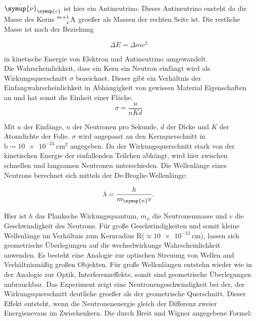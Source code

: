 \noindent $\bar{\symup{\nu}}_{\symup{e}}$ ist hier ein Antineutrino. Dieses Antineutrino ensteht da die Masse des Kerns $\ce{^{m+1}_z \text{A}}$ 
groeßer als Massen der rechten Seite ist. Die restliche Masse ist nach der Beziehung

\begin{equation*}
   \Delta E = \Delta m c^2 \nonumber
\end{equation*}

\noindent in kinetische Energie von Elektron und Antineutrino umgewandelt.\\
Die Wahrscheinlichkeit, dass ein Kern ein Neutron einfängt wird als Wirkungsquerschnitt $\sigma$ bezeichnet. Dieser gibt ein Verhältnis der 
Einfangwahrscheinlichkeit in Abhängigkeit von gewissen Material Eigenschaften an und hat somit die Einheit einer Fläche.
\begin{equation*}
   \sigma = \frac{u}{nKd} \nonumber
\end{equation*}

\noindent Mit $u$ der Einfänge, $n$ der Neutronen pro Sekunde, $d$ der Dicke und $K$ der Atomdichte der Folie. $\sigma$ wird angepasst an den 
Kernquerschnitt in $\si{\barn} \coloneqq \SI{10e-24}{\centi\metre\squared}$  angegeben. Da der Wirkungsquerschnitt stark von der kinetischen Energie 
der einfallenden Teilchen abhängt, wird hier zwischen schnellen und langsamen Neutronen unterschieden. Die Wellenlänge eines Neutrons 
berechnet sich mittels der De-Broglie-Wellenlänge:

\begin{equation*}
   \lambda = \frac{h}{m_{\symup{n}}v}. \nonumber
\end{equation*}

\noindent Hier ist $h$ das Planksche Wirkungsquantum, $m_n$ die Neutronenmasse und $v$ die Geschwindigkeit des Neutrons. Für große Geschwindigkeiten 
und somit kleine Wellenlänge im Verhältnis zum Kernradius R($\approx \SI{10e-12}{\centi\meter}$), lassen sich geometrische Überlegungen auf die 
wechselwirkungs Wahrscheinlichkeit anwenden. Es besteht eine Analogie zur optischen Streuung von Wellen and Verhältnismäßig großen Objekten. ­Für 
große Wellenlängen entstehn wieder wie in der Analogie zur Optik, Interferenzeffekte, somit sind geometrische Überlegungen unbrauchbar. Das 
Experiment zeigt eine Neutronengeschwindigkeit bei der, der Wirkungsquerschnitt deutliche groeßer als der geometrische Querschnitt. Dieser Effekt
entsteht, wenn die Neutronenenergie gleich der Differenz zweier Energienevaus im Zwischenkern. Die durch Breit und Wigner angegebene Formel:

